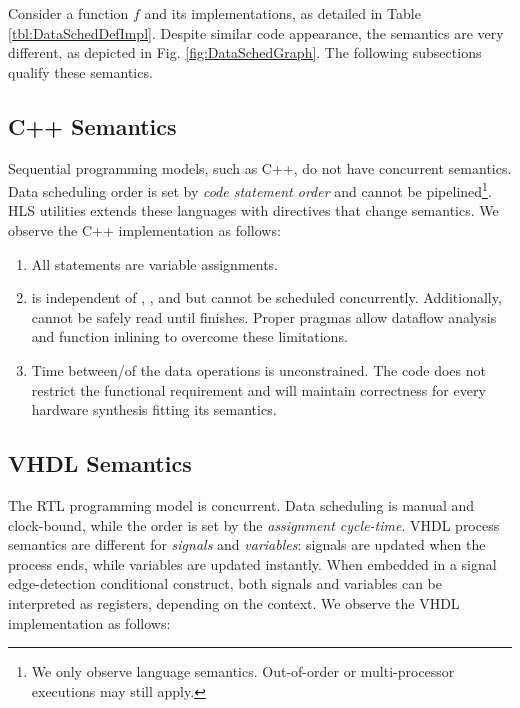 Consider a function $f$ and its implementations, as detailed in Table \ref{tbl:DataSchedDefImpl}. Despite similar code appearance, the semantics are very different, as depicted in Fig. \ref{fig:DataSchedGraph}. The following subsections qualify these semantics.


\subsection{C++ Semantics}
Sequential programming models, such as C++, do not have concurrent semantics. Data scheduling order is set by \textit{code statement order} and cannot be pipelined\footnote{We only observe language semantics. Out-of-order or multi-processor executions may still apply.}. HLS utilities extends these languages with  directives that change semantics. We observe the C++  implementation as follows:

\begin{enumerate}[leftmargin=*]
  \item All statements are variable assignments.
  \item {} is independent of , , and  but cannot be scheduled concurrently. Additionally,  cannot be safely read until  finishes. Proper pragmas allow dataflow analysis and function inlining to overcome these limitations.
  \item Time between/of the data operations is unconstrained. The code does not restrict the functional requirement and will maintain correctness for every hardware synthesis fitting its semantics. 
\end{enumerate}  

\subsection{VHDL Semantics}
The RTL programming model is concurrent. Data scheduling is manual and clock-bound, while the order is set by the \textit{assignment cycle-time}. VHDL process semantics are different for \textit{signals} and \textit{variables}: signals are updated when the process ends, while variables are updated instantly. When embedded in a signal edge-detection conditional construct, both signals and variables can be interpreted as registers, depending on the context. We observe the VHDL  implementation as follows:

